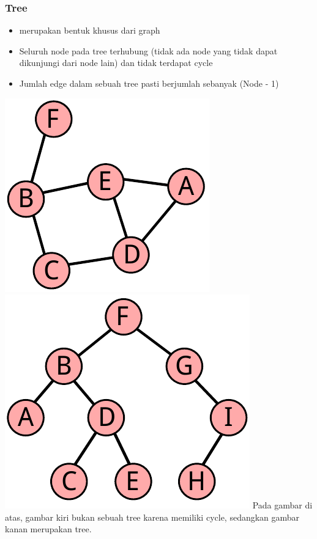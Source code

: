 \begin{frame}
\frametitle{Tree}
\begin{itemize}
  \item {} merupakan bentuk khusus dari graph
  \item Seluruh node pada tree terhubung (tidak ada node yang tidak dapat dikunjungi dari node lain) dan tidak terdapat \alert{cycle}
  \item Jumlah edge dalam sebuah tree pasti berjumlah sebanyak (Node - 1)
\end{itemize}

\includegraphics[width=3.5 cm]{asset/not-tree.pdf}
\hspace{\fill}
\includegraphics[width=4 cm]{asset/tree.pdf}
\newline\newline
Pada gambar di atas, gambar kiri bukan sebuah tree karena memiliki cycle, sedangkan gambar kanan merupakan tree. 
\end{frame}


